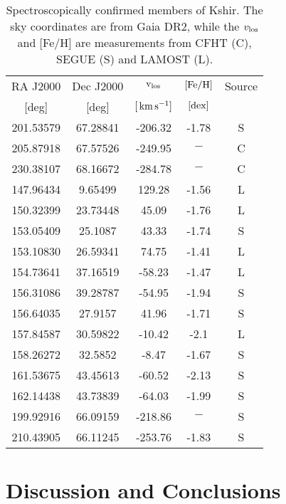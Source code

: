 \documentclass[apj]{emulateapj}
\def\kms{{\rm\,km\,s^{-1}}}
\begin{document}
\begin{table}
\caption{Spectroscopically confirmed members of Kshir. The sky coordinates are from Gaia DR2, while the $v_{\rm los}$ and [Fe/H] are measurements from CFHT (C), SEGUE (S) and LAMOST (L).}
\vspace{-0.4cm}
\label{tab:GD1x_inventory}
\begin{center}
\begin{tabular}{ccccc}
\hline
RA J2000 & Dec J2000 & $\rm{v_{los}}$ & ${\rm [Fe/H]}$  & Source \\

[deg] & [deg] & $[\kms]$ & $[\rm{dex}]$  & \\
\hline

201.53579  &  67.28841  &  -206.32  &  -1.78 &     S\\
205.87918  &  67.57526  &  -249.95  &    $-$    &     C\\
230.38107  &  68.16672  &  -284.78  &    $-$    &     C\\
\hline
147.96434 	&	9.65499 	&	129.28 	&	-1.56 	&	L\\
150.32399 	&	23.73448 	&	45.09 	&	-1.76 	&	L\\
153.05409 	&	25.1087 	&	43.33 	&	-1.74 	&	S\\
153.10830 	&	26.59341 	&	74.75 	&	-1.41 	&	L\\
154.73641 	&	37.16519 	&	-58.23 	&	-1.47 	&	L\\
156.31086 	&	39.28787 	&	-54.95 	&	-1.94 	&	S\\
156.64035 	&	27.9157 	&	41.96 	&	-1.71 	&	S\\
157.84587 	&	30.59822 	&	-10.42 	&	-2.1 	&	L\\
158.26272 	&	32.5852 	&	-8.47 	&	-1.67 	&	S\\
161.53675 	&	43.45613 	&	-60.52 	&	-2.13 	&	S\\
162.14438 	&	43.73839 	&	-64.03 	&	-1.99 	&	S\\
199.92916 	&	66.09159 	&	-218.86 &	$-$ 	&	S\\
210.43905 	&	66.11245 	&	-253.76 &	-1.83 	&	S\\




\hline
\end{tabular}
\end{center}
\end{table}



\section{Discussion and Conclusions}\label{sec:Discussion}
\end{document}
